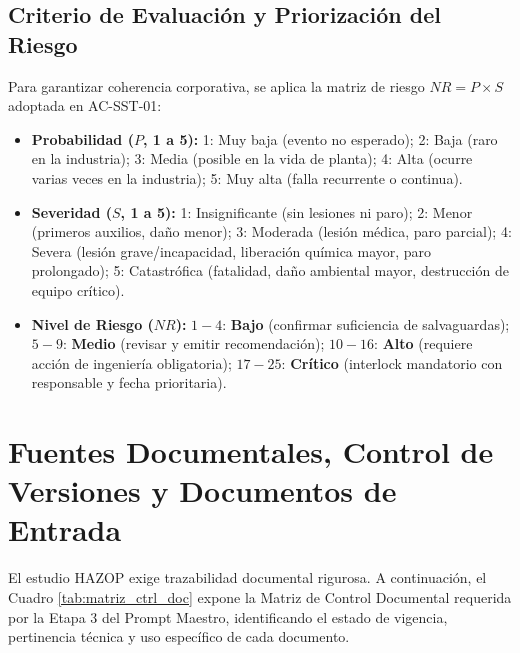 \documentclass[10pt,letterpaper]{article}
\begin{document}
\subsection{Criterio de Evaluación y Priorización del Riesgo}
Para garantizar coherencia corporativa, se aplica la matriz de riesgo $NR = P \times S$ adoptada en AC-SST-01:
\begin{itemize}
    \item \textbf{Probabilidad ($P$, 1 a 5):} 1: Muy baja (evento no esperado); 2: Baja (raro en la industria); 3: Media (posible en la vida de planta); 4: Alta (ocurre varias veces en la industria); 5: Muy alta (falla recurrente o continua).
    \item \textbf{Severidad ($S$, 1 a 5):} 1: Insignificante (sin lesiones ni paro); 2: Menor (primeros auxilios, daño menor); 3: Moderada (lesión médica, paro parcial); 4: Severa (lesión grave/incapacidad, liberación química mayor, paro prolongado); 5: Catastrófica (fatalidad, daño ambiental mayor, destrucción de equipo crítico).
    \item \textbf{Nivel de Riesgo ($NR$):} $1-4$: \textbf{Bajo} (confirmar suficiencia de salvaguardas); $5-9$: \textbf{Medio} (revisar y emitir recomendación); $10-16$: \textbf{Alto} (requiere acción de ingeniería obligatoria); $17-25$: \textbf{Crítico} (interlock mandatorio con responsable y fecha prioritaria).
\end{itemize}
\newpage

\section{Fuentes Documentales, Control de Versiones y Documentos de Entrada}
El estudio HAZOP exige trazabilidad documental rigurosa. A continuación, el Cuadro \ref{tab:matriz_ctrl_doc} expone la Matriz de Control Documental requerida por la Etapa 3 del Prompt Maestro, identificando el estado de vigencia, pertinencia técnica y uso específico de cada documento.
\end{document}
